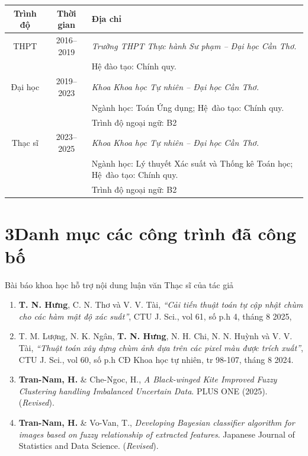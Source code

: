 	\begin{table}[H]
		\centering
		\begin{tabular*}{\columnwidth}{@{\extracolsep\fill}ccp{10cm}@{\extracolsep\fill}} 
		\toprule
	\bf	Trình độ &\bf Thời gian &\bf Địa chỉ \\ \midrule
		THPT
		& 2016–2019
		& \it Trường THPT Thực hành Sư phạm – Đại học Cần Thơ.\\
		& &  Hệ đào tạo: Chính quy.\\ 
		
		Đại học
		& 2019–2023
		& \it Khoa Khoa học Tự nhiên – Đại học Cần Thơ.\\
		& & Ngành học: Toán Ứng dụng; Hệ~đào tạo: Chính quy.\\ 
		&& Trình độ ngoại ngữ: B2\\
		
		Thạc sĩ
		& 2023–2025
		&\it Khoa Khoa học Tự nhiên – Đại học Cần Thơ.\\
		& & Ngành học: Lý thuyết Xác suất và Thống kê Toán học; Hệ~đào tạo: Chính quy.\\
		&& Trình độ ngoại ngữ: B2\\ \bottomrule
\end{tabular*}
\end{table}



\section*{3\qquad Danh mục các công trình đã công bố}

Bài báo khoa học hỗ trợ nội dung luận văn Thạc sĩ của tác giả

\begin{enumerate}[label=(\roman*)]
\item	\textbf{T. N. Hưng}, C. N. Thơ và V. V. Tài, \textit{“Cải tiến thuật toán tự cập nhật chùm cho các hàm mật độ xác suất”}, CTU J. Sci., vol 61, số p.h 4, tháng 8 2025,
\item T. M. Lượng, N. K. Ngân, \textbf{T. N. Hưng}, N. H. Chi, N. N. Huỳnh và V. V. Tài, \textit{“Thuật toán xây dựng chùm ảnh dựa trên các pixel màu được trích xuất”}, CTU J. Sci., vol 60, số p.h CĐ Khoa học tự nhiên, tr 98-107, tháng 8 2024.
	\item \textbf{Tran-Nam, H.} \& Che-Ngoc, H., \textit{A Black-winged Kite Improved Fuzzy Clustering handling Imbalanced Uncertain Data}. PLUS ONE (2025). (\textit{Revised}).
	\item \textbf{Tran-Nam, H.} \& Vo-Van, T., \textit{Developing Bayesian classifier algorithm for images based on fuzzy relationship of extracted features}.  Japanese Journal of Statistics and Data Science. (\textit{Revised}).
\end{enumerate}

